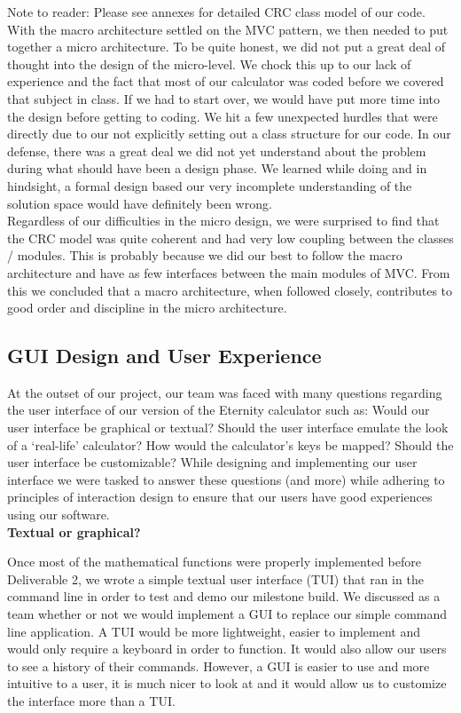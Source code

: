 \documentclass[a4paper, 12pt]{article}
\begin{document}
Note to reader: Please see annexes for detailed CRC class model of our code.
\\

With the macro architecture settled on the MVC pattern, we then needed to put together a micro architecture. To be quite honest, we did not put a great deal of thought into the design of the micro-level. We chock this up to our lack of experience and the fact that most of our calculator was coded before we covered that subject in class. If we had to start over, we would have put more time into the design before getting to coding. We hit a few unexpected hurdles that were directly due to our not explicitly setting out a class structure for our code. In our defense, there was a great deal we did not yet understand about the problem during what should have been a design phase. We learned while doing and in hindsight, a formal design based our very incomplete understanding of the solution space would have definitely been wrong.
\\

Regardless of our difficulties in the micro design, we were surprised to find that the CRC model was quite coherent and had very low coupling between the classes / modules. This is probably because we did our best to follow the macro architecture and have as few interfaces between the main modules of MVC. From this we concluded that a macro architecture, when followed closely, contributes to good order and discipline in the micro architecture.


\subsection{GUI Design and User Experience}

At the outset of our project, our team was faced with many questions regarding the user interface of our version of the Eternity calculator such as: Would our user interface be graphical or textual? Should the user interface emulate the look of a ‘real-life’ calculator? How would the calculator’s keys be mapped? Should the user interface be customizable? While designing and implementing our user interface we were tasked to answer these questions (and more) while adhering to principles of interaction design to ensure that our users have good experiences using our software. 
\\

\textbf{Textual or graphical?}

Once most of the mathematical functions were properly implemented before Deliverable 2, we wrote a simple textual user interface (TUI) that ran in the command line in order to test and demo our milestone build. We discussed as a team whether or not we would implement a GUI to replace our simple command line application. A TUI would be more lightweight, easier to implement and would only require a keyboard in order to function. It would also allow our users to see a history of their commands. However, a GUI is easier to use and more intuitive to a user, it is much nicer to look at and it would allow us to customize the interface more than a TUI. 
\\
\end{document}
